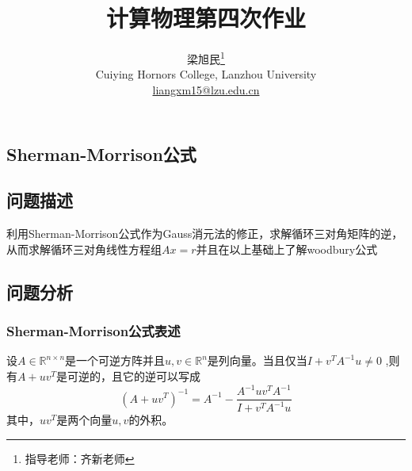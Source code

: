 \documentclass[twoside,twocolumn]{article}
\begin{document}
\begin{CJK*}{UTF8}{gkai}

\setlength{\droptitle}{-4\baselineskip} %
\pretitle{\begin{center}\Huge\bfseries} %
	\posttitle{\end{center}} %
\title{计算物理第四次作业} %
\author{
	\textsc{梁旭民}\thanks{\noindent 指导老师：齐新老师} \\[1ex] %
	\normalsize Cuiying Hornors College, Lanzhou University \\ %
	\normalsize \href{mailto:liangxm15@lzu.edu.cn}{liangxm15@lzu.edu.cn} %
}
\date{}
\renewcommand{\maketitlehookd}{
	\begin{abstract}
		本次计算物理作业有两个问题：第一个问题是学习Sherman-Morrison公式及Sherman-Morrison-Woodbury公式，并利用公式将对于循环三对角线性方程组的求解问题转化为对于三对角线性方程组的求解，从而使得问题得到简化。第二个问题则是利用有限差分的方法求解一个具体的物理问题：第一类边界条件下的Poisson-Boltzman方程从而求解出等离子体孤波的电势分布情况。
	\end{abstract}
}
\maketitle


\section{Sherman-Morrison公式}
\subsection{问题描述}
利用Sherman-Morrison公式作为Gauss消元法的修正，求解循环三对角矩阵的逆，从而求解循环三对角线性方程组$Ax=r$并且在以上基础上了解woodbury公式
\subsection{问题分析}
\subsubsection{Sherman-Morrison公式表述}
设$A\in \mathbb{R}^{n\times n}$是一个可逆方阵并且$u,v\in \mathbb{R}^{n}$是列向量。当且仅当$I+v^{T}A^{-1}u\neq 0$ ,则有$A+uv^{T}$是可逆的，且它的逆可以写成
\begin{equation*}
	(A+uv^{T})^{-1}=A^{-1}-\frac{A^{-1}uv^{T}A^{-1}}{I+v^{T}A^{-1}u}
\end{equation*}
其中，$uv^{T}$是两个向量$u,v$的外积。

\end{CJK*}
\end{document}
